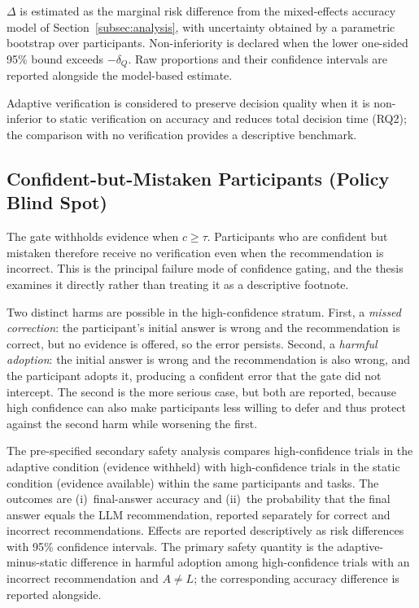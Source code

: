 \documentclass[oneside,final,14pt,a4paper]{extreport}
\begin{document}
$\Delta$ is estimated as the marginal risk difference from the mixed-effects
accuracy model of Section~\ref{subsec:analysis}, with uncertainty obtained by a
parametric bootstrap over participants. Non-inferiority is declared when the
lower one-sided 95\% bound exceeds $-\delta_Q$. Raw proportions and their
confidence intervals are reported alongside the model-based estimate.

Adaptive verification is considered to preserve decision quality when it is
non-inferior to static verification on accuracy and reduces total decision time
(RQ2); the comparison with no verification provides a descriptive benchmark.

\subsection{Confident-but-Mistaken Participants (Policy Blind Spot)}
\label{subsec:blindspot}

The gate withholds evidence when $c\geq\tau$. Participants who are confident but
mistaken therefore receive no verification even when the recommendation is
incorrect. This is the principal failure mode of confidence gating, and the
thesis examines it directly rather than treating it as a descriptive footnote.

Two distinct harms are possible in the high-confidence stratum. First, a
\emph{missed correction}: the participant's initial answer is wrong and the
recommendation is correct, but no evidence is offered, so the error persists.
Second, a \emph{harmful adoption}: the initial answer is wrong and the
recommendation is also wrong, and the participant adopts it, producing a
confident error that the gate did not intercept. The second is the more serious
case, but both are reported, because high confidence can also make participants
less willing to defer and thus protect against the second harm while worsening
the first.

The pre-specified secondary safety analysis compares high-confidence trials in
the adaptive condition (evidence withheld) with high-confidence trials in the
static condition (evidence available) within the same participants and tasks.
The outcomes are (i)~final-answer accuracy and (ii)~the probability that the
final answer equals the LLM recommendation, reported separately for correct and
incorrect recommendations. Effects are reported descriptively as risk
differences with 95\% confidence intervals. The primary safety quantity is the adaptive-minus-static difference
in harmful adoption among high-confidence trials with an incorrect
recommendation and $A\neq L$; the corresponding accuracy difference is reported
alongside.
\end{document}
